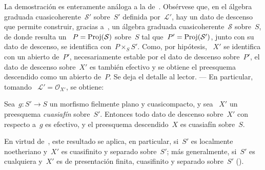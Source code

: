 La demostración es enteramente análoga a la de~. Obsérvese
que, en el álgebra graduada cuasicoherente~$\mathcal{S}'$ sobre~$S'$
definida por~$\mathcal{L}'$, hay un dato de descenso que permite construir,
gracias a~, un álgebra graduada
cuasicoherente~$\mathcal{S}$ sobre~$S$, de donde resulta un
~$P=\operatorname{Proj}(\mathcal{S})$ sobre~$S$ tal que~$P'=\operatorname{Proj}(\mathcal{S}')$, junto con
su dato de descenso, se identifica con~$P\times_{S}S'$. Como, por hipótesis,
~$X'$ se identifica con un abierto de~$P'$, necesariamente estable por el
dato de descenso sobre~$P'$, el dato de descenso sobre~$X'$ es también
efectivo y se obtiene el preesquema descendido como un abierto de~$P$. Se
deja el detalle al lector. --- En particular, tomando
~$\mathcal{L}'=\mathcal{O}_{X'}$, se obtiene:

\begin{corollaire}
\label{VIII.7.9}
Sea~$g\colon S'\to S$ un morfismo fielmente plano y cuasicompacto, y sea
~$X'$ un preesquema \emph{cuasiafín} sobre~$S'$. Entonces todo dato de
descenso sobre~$X'$ con respecto a~$g$ es efectivo, y el preesquema
descendido~$X$ es cuasiafín sobre~$S$.
\end{corollaire}

En virtud de~, este resultado se aplica, en particular, si~$S'$
es localmente noetheriano y~$X'$ es cuasifinito y separado sobre~$S'$; más
generalmente, si~$S'$ es cualquiera y~$X'$ es de presentación finita,
cuasifinito y separado sobre~$S'$ (\cf {}).

